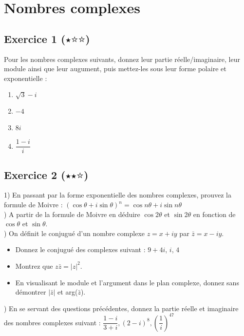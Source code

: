 \documentclass{article}
\begin{document}
\section{Nombres complexes}

\subsection*{Exercice 1 ($\medblackstar \medwhitestar \medwhitestar$)}

Pour les nombres complexes suivants, donnez leur partie réelle/imaginaire, leur module ainsi que leur augument, puis mettez-les sous leur forme polaire et exponentielle :
\begin{enumerate}
    \item $\sqrt{3}-i$
    \item $-4$
    \item $8i$
    \item $\dfrac{1-i}{i}$
\end{enumerate}

\subsection*{Exercice 2 ($\medblackstar \medblackstar \medwhitestar$)}

1) En passant par la forme exponentielle des nombres complexes, prouvez la formule de Moivre : $(\cos{\theta} + i\sin{\theta})^n= \cos{n\theta} + i\sin{n\theta}$ \\

) A partir de la formule de Moivre en déduire $\cos{2\theta}$ et $\sin{2\theta}$ en fonction de $\cos{\theta}$ et $\sin{\theta}$. \\

) On définit le conjugué d'un nombre complexe $z = x + iy$ par $\bar z = x - iy$. \begin{itemize}
    \item Donnez le conjugué des complexes suivant : $9+4i$, $i$, $4$
    \item Montrez que $z\bar z = |z|^2$.
    \item En visualisant le module et l'argument dans le plan complexe, donnez sans démontrer $|\bar z|$ et arg($\bar z$).
\end{itemize} 

) En se servant des questions précédentes, donnez la partie réelle et imaginaire des nombres complexes suivant : $\dfrac{1-i}{3+i}, (2-i)^8, \left(\dfrac{1}{i}\right)^{47}$ 
\end{document}

